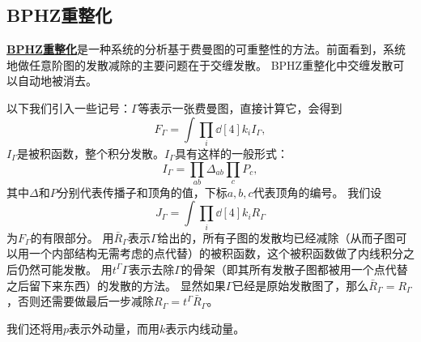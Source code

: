 \documentclass[hyperref, UTF8, a4paper]{ctexart}
\newcommand{\concept}[1]{\underline{\textbf{#1}}}
\begin{document}
\subsection{BPHZ重整化}\label{sec:bphz}

\concept{BPHZ重整化}是一种系统的分析基于费曼图的可重整性的方法。前面看到，系统地做任意阶图的发散减除的主要问题在于交缠发散。
BPHZ重整化中交缠发散可以自动地被消去。

以下我们引入一些记号：$\Gamma$等表示一张费曼图，直接计算它，会得到
\begin{equation}
    F_\Gamma = \int \prod_i \dd[4]{k_i} I_\Gamma,
\end{equation}
$I_\Gamma$是被积函数，整个积分发散。$I_\Gamma$具有这样的一般形式：
\begin{equation}
    I_\Gamma = \prod_{ab} \Delta_{ab} \prod_c P_c,
\end{equation}
其中$\Delta$和$P$分别代表传播子和顶角的值，下标$a, b, c$代表顶角的编号。
我们设
\begin{equation}
    J_\Gamma = \int \prod_i \dd[4]{k_i} R_\Gamma
\end{equation}
为$F_\Gamma$的有限部分。
用$\bar{R}_\Gamma$表示$\Gamma$给出的，所有子图的发散均已经减除（从而子图可以用一个内部结构无需考虑的点代替）的被积函数，这个被积函数做了内线积分之后仍然可能发散。
用$t^\Gamma \Gamma$表示去除$\Gamma$的骨架（即其所有发散子图都被用一个点代替之后留下来东西）的发散的方法。
显然如果$\Gamma$已经是原始发散图了，那么$\bar{R}_\Gamma = R_\Gamma$，否则还需要做最后一步减除$R_\Gamma = t^\Gamma \bar{R}_\Gamma$。

我们还将用$p$表示外动量，而用$k$表示内线动量。
\end{document}
